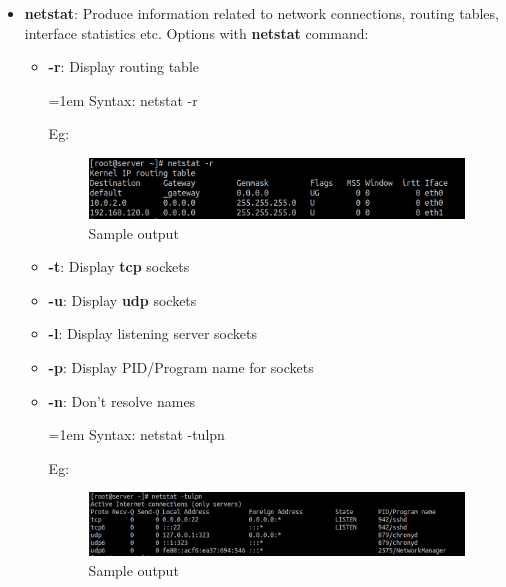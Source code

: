 \setlength{\columnsep}{3pt}
\begin{flushleft}

\bigskip

\begin{itemize}
	\item \textbf{netstat}: Produce information related to network connections, routing tables, interface statistics etc.
	\newline
	Options with \textbf{netstat} command:
	\begin{itemize}
		\item \textbf{-r}: Display routing table
		\bigskip
		\begin{tcolorbox}[breakable,notitle,boxrule=0pt,colback=pink,colframe=pink]
			\color{black}
			\font=1em
			Syntax: netstat -r
			\font=4pt
		\end{tcolorbox}
		Eg:
		\begin{figure}[h!]
			\centering
			\includegraphics[scale=0.3]{content/chapter15/images/netstat_r.png}
			\caption{Sample output}
			\label{fig:output5}
		\end{figure}

		\item \textbf{-t}: Display \textbf{tcp} sockets
		\item \textbf{-u}: Display \textbf{udp} sockets
		\item \textbf{-l}: Display listening server sockets
		\item \textbf{-p}: Display PID/Program name for sockets
		\item \textbf{-n}: Don't resolve names
		\bigskip
		\begin{tcolorbox}[breakable,notitle,boxrule=0pt,colback=pink,colframe=pink]
			\color{black}
			\font=1em
			Syntax: netstat -tulpn
			\font=4pt
		\end{tcolorbox}
		Eg:
		\begin{figure}[h!]
			\centering
			\includegraphics[scale=0.25]{content/chapter15/images/netstat_tulpn.png}
			\caption{Sample output}
			\label{fig:output6}
		\end{figure}
			

\end{itemize}
\end{itemize}
\end{flushleft}
